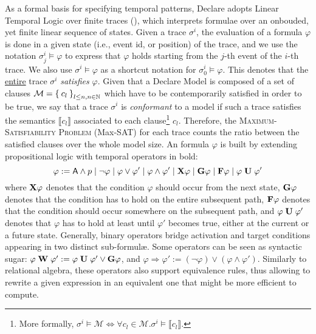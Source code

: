 As a formal basis for specifying temporal patterns, Declare adopts %
Linear Temporal Logic over finite traces (\LTLf), which interprets formulae over an onbouded, yet finite linear sequence of states. %
Given a trace $\sigma^i$, the evaluation of a formula $\varphi$ is done in a given state (i.e., event id, or position) of the trace, and we use the notation $\sigma^i_j\vDash\varphi$ to express that $\varphi$ holds starting from the $j$-th event of the $i$-th trace. We also use $\sigma^i\vDash\varphi$ as a shortcut notation for $\sigma^i_0\vDash\varphi$.  %
 This
 denotes that the \underline{entire} trace $\sigma^i$ \textit{satisfies} $\varphi$. Given that a Declare Model  is composed of a set of clauses $\mathcal{M}=\Set{c_l}_{l\leq n,n\in\mathbb{N}}$ which have to be contemporarily satisfied in order to be true, we say that a trace $\sigma^i$ is \textit{conformant} to a model if such a trace satisfies the  \LTLf semantics $\llbracket c_l\rrbracket$ associated to each clause\footnote{More formally, $\sigma^i\vDash\mathcal{M}\Leftrightarrow \forall c_l\in \mathcal{M}. \sigma^i\vDash\llbracket c_l\rrbracket$.} $c_l$. Therefore, the \textsc{Maximum-Satisfiability Problem} (Max-SAT) for each trace counts the ratio between the satisfied clauses over the whole model size.
 An \LTLf formula $\varphi$ is built by extending propositional logic with temporal operators in bold: \[\varphi:=\textsf{A}\wedge p\;|\;\neg \varphi\;|\;\varphi\vee \varphi'\;|\;\varphi\wedge\varphi'\;|\;\mathbf{X}{\varphi}\;|\;\mathbf{G}{\varphi}\;|\;\mathbf{F}{\varphi}\;|\;{\varphi}\;\mathbf{U}\;{\varphi'}\] where $\mathbf{X}{\varphi}$ denotes that the condition $\varphi$ should occur from the next state, $\mathbf{G}{\varphi}$ denotes that the condition has to hold on the entire subsequent path, $\mathbf{F}{\varphi}$ denotes that the condition should occur somewhere on the subsequent path, and ${\varphi}\;\mathbf{U}\;{\varphi'}$ denotes that $\varphi$ has to hold at least until $\varphi'$ becomes true, either at the current or a future state. Generally, binary operators bridge activation and target conditions appearing in two distinct sub-formul\ae. Some operators can be seen as syntactic sugar: ${\varphi}\;\mathbf{W}\;{\varphi'}:={\varphi}\;\mathbf{U}\;{\varphi'}\vee\mathbf{G}{\varphi}$, and $\varphi\Rightarrow\varphi':=(\neg \varphi)\vee (\varphi\wedge \varphi')$. Similarly to relational algebra, these operators also support equivalence rules, thus allowing to rewrite a given \LTLf expression in an equivalent one that might be more efficient to compute.

